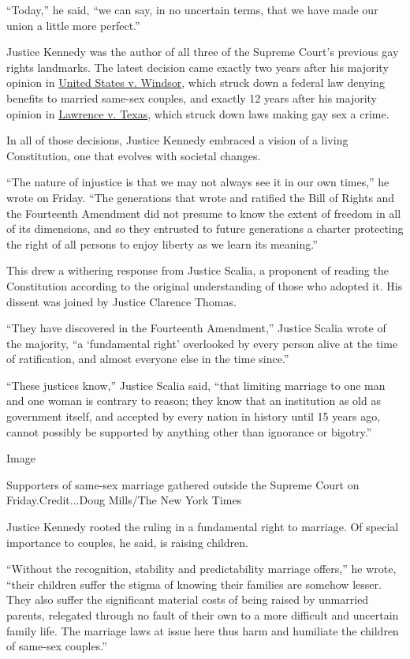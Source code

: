 ``Today,'' he said, ``we can say, in no uncertain terms, that we have
made our union a little more perfect.''

Justice Kennedy was the author of all three of the Supreme Court's
previous gay rights landmarks. The latest decision came exactly two
years after his majority opinion in
\href{https://www.law.cornell.edu/supremecourt/text/12-307}{United
States v. Windsor}, which struck down a federal law denying benefits to
married same-sex couples, and exactly 12 years after his majority
opinion in
\href{https://www.law.cornell.edu/supct/html/02-102.ZO.html}{Lawrence v.
Texas}, which struck down laws making gay sex a crime.

In all of those decisions, Justice Kennedy embraced a vision of a living
Constitution, one that evolves with societal changes.

``The nature of injustice is that we may not always see it in our own
times,'' he wrote on Friday. ``The generations that wrote and ratified
the Bill of Rights and the Fourteenth Amendment did not presume to know
the extent of freedom in all of its dimensions, and so they entrusted to
future generations a charter protecting the right of all persons to
enjoy liberty as we learn its meaning.''

This drew a withering response from Justice Scalia, a proponent of
reading the Constitution according to the original understanding of
those who adopted it. His dissent was joined by Justice Clarence Thomas.

``They have discovered in the Fourteenth Amendment,'' Justice Scalia
wrote of the majority, ``a `fundamental right' overlooked by every
person alive at the time of ratification, and almost everyone else in
the time since.''

``These justices know,'' Justice Scalia said, ``that limiting marriage
to one man and one woman is contrary to reason; they know that an
institution as old as government itself, and accepted by every nation in
history until 15 years ago, cannot possibly be supported by anything
other than ignorance or bigotry.''

Image

Supporters of same-sex marriage gathered outside the Supreme Court on
Friday.Credit...Doug Mills/The New York Times

Justice Kennedy rooted the ruling in a fundamental right to marriage. Of
special importance to couples, he said, is raising children.

``Without the recognition, stability and predictability marriage
offers,'' he wrote, ``their children suffer the stigma of knowing their
families are somehow lesser. They also suffer the significant material
costs of being raised by unmarried parents, relegated through no fault
of their own to a more difficult and uncertain family life. The marriage
laws at issue here thus harm and humiliate the children of same-sex
couples.''

